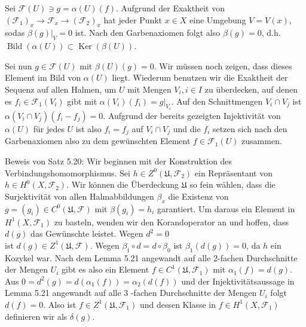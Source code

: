 \documentclass[10pt, letterpaper]{article}
\begin{document}
Sei $\mathcal{F}(U) \ni g=\alpha(U)(f)$. Aufgrund der Exaktheit von $\left(\mathcal{F}_{1}\right)_{x} \rightarrow \mathcal{F}_{x} \rightarrow\left(\mathcal{F}_{2}\right)_{x}$ hat jeder Punkt $x \in X$ eine Umgebung $V=V(x)$, sodas $\left.\beta(g)\right|_{V}=0$ ist. Nach den Garbenaxiomen folgt also $\beta(g)=0$, d.h. $\operatorname{Bild}(\alpha(U)) \subset \operatorname{Ker}(\beta(U))$.

Sei nun $g \in \mathcal{F}(U)$ mit $\beta(U)(g)=0$. Wir müssen noch zeigen, dass dieses Element im Bild von $\alpha(U)$ liegt. Wiederum benutzen wir die Exaktheit der Sequenz auf allen Halmen, um $U$ mit Mengen $V_{i}, i \in I$ zu überdecken, auf denen es $f_{i} \in \mathcal{F}_{1}\left(V_{i}\right)$ gibt mit $\alpha\left(V_{i}\right)\left(f_{i}\right)=\left.g\right|_{V_{i}}$. Auf den Schnittmengen $V_{i} \cap V_{j}$ ist $\alpha\left(V_{i} \cap V_{j}\right)\left(f_{i}-f_{j}\right)=0$. Aufgrund der bereits gezeigten Injektivität von $\alpha(U)$ für jedes $U$ ist also $f_{i}=f_{j}$ auf $V_{i} \cap V_{j}$ und die $f_{i}$ setzen sich nach den Garbenaxiomen also zu dem gewünschten Element $f \in \mathcal{F}_{1}(U)$ zusammen.

Beweis von Satz 5.20: Wir beginnen mit der Konstruktion des Verbindungshomomorphismus. Sei $h \in Z^{0}\left(\mathfrak{U}, \mathcal{F}_{2}\right)$ ein Repräsentant von $h \in H^{0}\left(X, \mathcal{F}_{2}\right)$. Wir können die Überdeckung $\mathfrak{U}$ so fein wählen, dass die Surjektivität von allen Halmabbildungen $\beta_{x}$ die Existenz von $g=\left(g_{i}\right) \in C^{0}(\mathfrak{U}, \mathcal{F})$ mit $\beta\left(g_{i}\right)=h_{i}$ garantiert. Um daraus ein Element in $H^{1}\left(X, \mathcal{F}_{1}\right)$ zu basteln, wenden wir den Korandoperator an und hoffen, dass $d(g)$ das Gewünschte leistet. Wegen $d^{2}=0$\\
ist $d(g) \in Z^{1}(\mathfrak{U}, \mathcal{F})$. Wegen $\beta_{1} \circ d=d \circ \beta_{0}$ ist $\beta_{1}(d(g))=0$, da $h$ ein Kozykel war. Nach dem Lemma 5.21 angewandt auf alle 2-fachen Durchschnitte der Mengen $U_{i}$ gibt es also ein Element $f \in C^{1}\left(\mathfrak{U}, \mathcal{F}_{1}\right)$ mit $\alpha_{1}(f)=d(g)$. Aus $0=d^{2}(g)=d\left(\alpha_{1}(f)\right)=\alpha_{2}(d(f))$ und der Injektivitätsaussage in Lemma 5.21 angewandt auf alle 3 -fachen Durchschnitte der Mengen $U_{i}$ folgt $d(f)=0$. Also ist $f \in Z^{1}\left(\mathfrak{U}, \mathcal{F}_{1}\right)$ und dessen Klasse in $f \in H^{1}\left(X, \mathcal{F}_{1}\right)$ definieren wir als $\delta(g)$.
\end{document}
